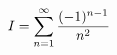 \documentclass[preview]{standalone}
\begin{document}
\begin{align*}
\special{dvisvgm:raw <g id='unique000'>}I=\sum_{n=1}^{\infty}\frac{(-1)^{n-1}}{n^2}\special{dvisvgm:raw </g>}
\end{align*}
\end{document}
